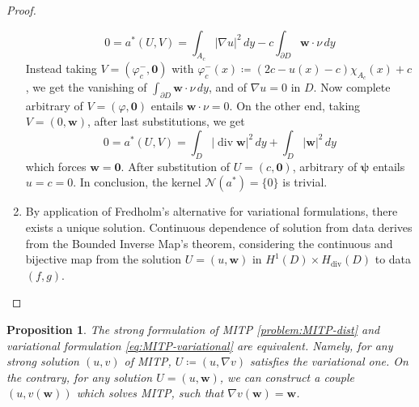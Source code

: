 \documentclass[10pt, a4paper, twoside, openright]{book}
\theoremstyle{definition}
\theoremstyle{plain}
\theoremstyle{plain}
\theoremstyle{plain}
\newtheorem{proposition}[subsection]{Proposition}
\theoremstyle{plain}
\theoremstyle{plain}
\theoremstyle{plain}
\theoremstyle{plain}
\theoremstyle{plain}
\DeclareMathOperator{\divergence}{div}
\let\phi\varphi
\begin{document}
\begin{proof}
\begin{enumerate}
\begin{equation*}
  0 = a^*(U,V)= \int_{A_c} |\nabla u|^2\,dy - c\int_{\partial D}\bm{w}\cdot\nu\, dy
\end{equation*}
 Instead taking $V=(\phi_c^-,\bm{0})$ with $\phi_c^-(x)\coloneqq (2c - u(x) - c)\chi_{A_c}(x) + c$, we get the vanishing of 
 $\int_{\partial D}\bm{w}\cdot\nu\,dy$, 
 and of $\nabla u=0$ in $D$. 
 Now complete arbitrary of $V=(\phi, \bm 0)$ entails 
 $\bm{w}\cdot\nu =0$.
 On the other end, taking $V=(0, \bm{w})$, after last substitutions, we get
\begin{equation*}
 0=a^*(U,V)=\int_D|\divergence \bm{w}|^2\,dy + \int_D|\bm{w}|^2\,dy
\end{equation*}
which forces $\bm{w}=\bm{0}$. After substitution of $U=(c,\bm 0)$, arbitrary of $\bm \psi$ entails $u=c=0$. 
In conclusion, the kernel $\mathcal{N}(a^*)=\{0\}$ is trivial.
\item By application of Fredholm's alternative for variational formulations, 
there exists a unique solution.
Continuous dependence of solution from data derives from the Bounded Inverse Map's theorem, considering the continuous and bijective map from the solution $U=(u,\bm w )$ in $H^1(D)\times H_{\divergence}(D)$ to data $(f,g)$.
\end{enumerate}
\end{proof}
\begin{proposition}
\label{prop:MITP-equivalence}
 The strong formulation of MITP \ref{problem:MITP-dist} and variational formulation 
 \eqref{eq:MITP-variational} are equivalent.
 Namely, for any strong solution $(u,v)$ of MITP, $U\coloneqq(u,\nabla v)$ satisfies the variational one. 
 On the contrary, for any solution $U=(u,\bm w)$, we can construct a couple $(u,v({\bm w}))$ 
 which solves MITP, such that $\nabla v(\bm w)=\bm w$.
\end{proposition}
\end{document}
